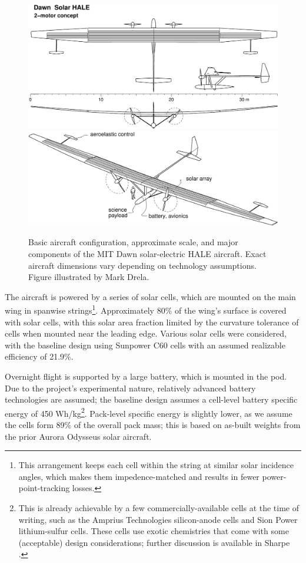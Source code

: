 \begin{figure}[h]
    \centering
    \includegraphics[width=\textwidth]{../figures/dawn1_3view.pdf}
    \includegraphics[width=\textwidth]{../figures/dawn1b.pdf}
    \caption{Basic aircraft configuration, approximate scale, and major components of the MIT Dawn solar-electric HALE aircraft. Exact aircraft dimensions vary depending on technology assumptions. Figure illustrated by Mark Drela.}
    \label{fig:dawn_overview}
\end{figure}


The aircraft is powered by a series of solar cells, which are mounted on the main wing in spanwise strings\footnote{This arrangement keeps each cell within the string at similar solar incidence angles, which makes them impedence-matched and results in fewer power-point-tracking losses.}. Approximately 80\% of the wing's surface is covered with solar cells, with this solar area fraction limited by the curvature tolerance of cells when mounted near the leading edge. Various solar cells were considered, with the baseline design using Sunpower C60 cells with an assumed realizable efficiency of 21.9\%.

Overnight flight is supported by a large battery, which is mounted in the pod. Due to the project's experimental nature, relatively advanced battery technologies are assumed; the baseline design assumes a cell-level battery specific energy of 450 Wh/kg\footnote{This is already achievable by a few commercially-available cells at the time of writing, such as the Amprius Technologies silicon-anode cells and Sion Power lithium-sulfur cells. These cells use exotic chemistries that come with some (acceptable) design considerations; further discussion is available in Sharpe \cite{sharpe_optimization_2021}.}. Pack-level specific energy is slightly lower, as we assume the cells form 89\% of the overall pack mass; this is based on as-built weights from the prior Aurora Odysseus solar aircraft.

